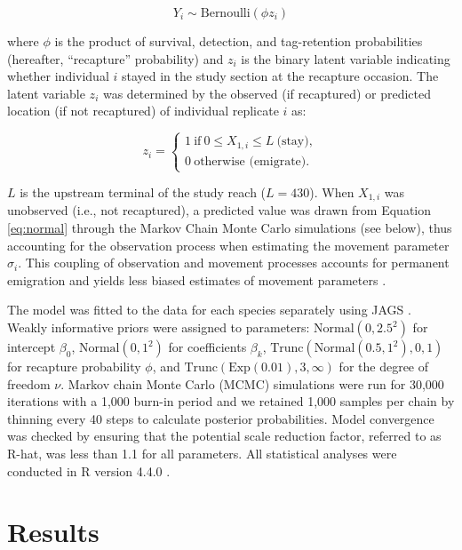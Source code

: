 \documentclass[11pt, class=article, crop=false]{standalone}
\begin{document}
\begin{equation}
    Y_i \sim \text{Bernoulli}(\phi z_i)
\end{equation}

where $\phi$ is the product of survival, detection, and tag-retention probabilities (hereafter, ``recapture'' probability) and $z_i$ is the binary latent variable indicating whether individual $i$ stayed in the study section at the recapture occasion.
The latent variable $z_i$ was determined by the observed (if recaptured) or predicted location (if not recaptured) of individual replicate $i$ as: 

\begin{equation}
    z_i =
    \begin{cases}
        1~\text{if}~0 \le X_{1,i} \le L~\text{(stay)},\\
        0~\text{otherwise (emigrate)}.
    \end{cases}
\end{equation}

$L$ is the upstream terminal of the study reach ($L = 430$). When $X_{1,i}$ was unobserved (i.e., not recaptured), a predicted value was drawn from Equation \ref{eq:normal} through the Markov Chain Monte Carlo simulations (see below), thus accounting for the observation process when estimating the movement parameter $\sigma_i$.
This coupling of observation and movement processes accounts for permanent emigration and yields less biased estimates of movement parameters \citep{teruiModelingDispersalUsing2020}.

The model was fitted to the data for each species separately using JAGS \citep{plummerJAGSProgramAnalysis2003}. Weakly informative priors were assigned to parameters: $\text{Normal}(0, 2.5^2)$ for intercept $\beta_0$, $\text{Normal}(0, 1^2)$ for coefficients $\beta_k$, $\text{Trunc}(\text{Normal}(0.5, 1^2), 0, 1)$ for recapture probability $\phi$, and $\text{Trunc}(\text{Exp}(0.01), 3, \infty)$ for the degree of freedom $\nu$. Markov chain Monte Carlo (MCMC) simulations were run for 30,000 iterations with a 1,000 burn-in period and we retained 1,000 samples per chain by thinning every 40 steps to calculate posterior probabilities. Model convergence was checked by ensuring that the potential scale reduction factor, referred to as R-hat, was less than 1.1 for all parameters. All statistical analyses were conducted in R version 4.4.0 \citep{rcoreteamLanguageEnvironmentStatistical2021}.

\section{Results}
\end{document}
